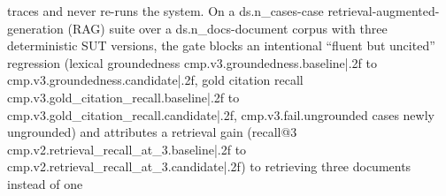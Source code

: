 traces and never re-runs the system. On a {{ds.n_cases}}-case
retrieval-augmented-generation (RAG) suite over a {{ds.n_docs}}-document corpus with
three deterministic SUT versions, the gate blocks an intentional ``fluent
but uncited'' regression (lexical groundedness {{cmp.v3.groundedness.baseline|.2f}} to {{cmp.v3.groundedness.candidate|.2f}}, gold citation
recall {{cmp.v3.gold_citation_recall.baseline|.2f}} to {{cmp.v3.gold_citation_recall.candidate|.2f}}, {{cmp.v3.fail.ungrounded}} cases newly ungrounded) and attributes a retrieval
gain (recall@3 {{cmp.v2.retrieval_recall_at_3.baseline|.2f}} to {{cmp.v2.retrieval_recall_at_3.candidate|.2f}}) to retrieving three documents instead of one
